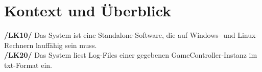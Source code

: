 \chapter{Kontext und Überblick}
\textbf{/LK10/} Das System ist eine Standalone-Software, die auf Windows- und Linux-Rechnern lauffähig sein muss. \\
\textbf{/LK20/} Das System liest Log-Files einer gegebenen GameController-Instanz im txt-Format ein. \\